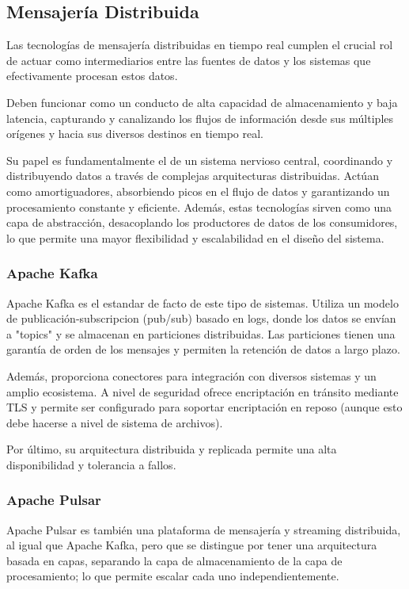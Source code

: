 \subsection{Mensajería Distribuida}

Las tecnologías de mensajería distribuidas en tiempo real cumplen el crucial rol de actuar como intermediarios entre las fuentes de datos 
y los sistemas que efectivamente procesan estos datos. \parencite{kleppmann} \newline

Deben funcionar como un conducto de alta capacidad de almacenamiento y baja latencia, capturando y canalizando los flujos de información
desde sus múltiples orígenes y hacia sus diversos destinos en tiempo real. \parencite{bigdata} \newline

Su papel es fundamentalmente el de un sistema nervioso central, coordinando y distribuyendo datos a través de complejas arquitecturas distribuidas. 
Actúan como amortiguadores, absorbiendo picos en el flujo de datos y garantizando un procesamiento constante y eficiente. 
Además, estas tecnologías sirven como una capa de abstracción, desacoplando los productores de datos de los consumidores, 
lo que permite una mayor flexibilidad y escalabilidad en el diseño del sistema.

\subsubsection{Apache Kafka}
Apache Kafka es el estandar de facto de este tipo de sistemas. Utiliza un modelo de publicación-subscripcion (pub/sub) basado en logs, 
donde los datos se envían a "topics" y se almacenan en particiones distribuidas. Las particiones tienen una garantía de orden de los mensajes
y permiten la retención de datos a largo plazo.\newline

Además, proporciona conectores para integración con diversos sistemas y un amplio ecosistema. A nivel de seguridad ofrece encriptación
en tránsito mediante TLS y permite ser configurado para soportar encriptación en reposo (aunque esto debe hacerse a nivel de sistema de archivos).
\newline

Por último, su arquitectura distribuida y replicada permite una alta disponibilidad y tolerancia a fallos.

\newpage
\subsubsection{Apache Pulsar}
Apache Pulsar es también una plataforma de mensajería y streaming distribuida, al igual que Apache Kafka, pero que se distingue por tener una 
arquitectura basada en capas, separando la capa de almacenamiento de la capa de procesamiento; lo que permite escalar cada uno independientemente.
\newline

